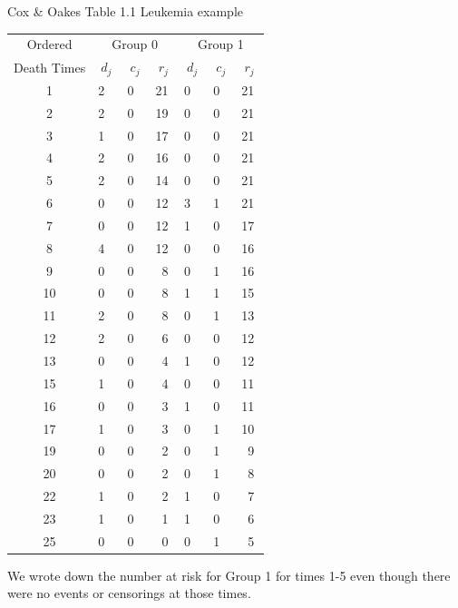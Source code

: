 \documentclass[envcountsect, 10pt, portrait, palatino]{beamer}
\begin{document}
\begin{frame}{Cox \& Oakes Table 1.1 Leukemia example}
\scriptsize
\vspace*{-.1in}
\begin{center}
\begin{tabular}{clll|lll}
Ordered     & \multicolumn{3}{c}{Group 0} &  \multicolumn{3}{c}{Group 1}  \\ \cline{2-7}
Death Times & $~d_j~$ & $~c_j~$ & $~r_j~$  &  $~d_j~$ & $~c_j~$ & $~r_j~$ \\\hline
  1         &  2      &   0     &  21      &    0    &    0    &   21 \\
  2         &  2      &   0     &  19      &    0    &    0    &   21 \\
  3         &  1      &   0     &  17      &    0    &    0    &   21 \\
  4         &  2      &   0     &  16      &    0    &    0    &   21 \\
  5         &  2      &   0     &  14      &    0    &    0    &   21 \\
  6         &  0      &   0     &  12      &    3    &    1    &   21 \\
  7         &  0      &   0     &  12      &    1    &    0    &   17 \\
  8         &  4      &   0     &  12      &    0    &    0    &   16 \\
  9         &  0      &   0     &  ~8      &    0    &    1    &   16 \\
 10         &  0      &   0     &  ~8      &    1    &    1    &   15 \\
 11         &  2      &   0     &  ~8      &    0    &    1    &   13 \\
 12         &  2      &   0     &  ~6      &    0    &    0    &   12 \\
 13         &  0      &   0     &  ~4      &    1    &    0    &   12 \\
 15         &  1      &   0     &  ~4      &    0    &    0    &   11 \\
 16         &  0      &   0     &  ~3      &    1    &    0    &   11 \\
 17         &  1      &   0     &  ~3      &    0    &    1    &   10 \\
 19         &  0      &   0     &  ~2      &    0    &    1    &   ~9 \\
 20         &  0      &   0     &  ~2      &    0    &    1    &   ~8 \\
 22         &  1      &   0     &  ~2      &    1    &    0    &   ~7 \\
 23         &  1      &   0     &  ~1      &    1    &    0    &   ~6 \\
 25         &  0      &   0     &  ~0      &    0    &    1    &   ~5 \\ \hline
\end{tabular}
\end{center}
\vspace*{-.05in}
\normalsize
We wrote down the number at risk for Group 1 for times 1-5 even though there were no events or censorings at those times.
\end{frame}
\end{document}
